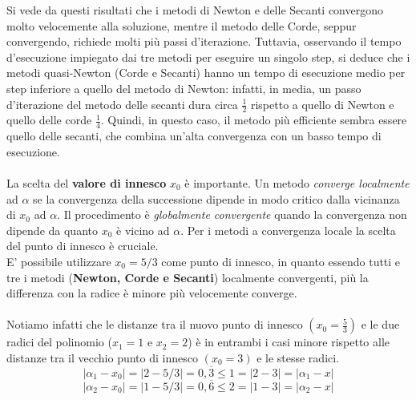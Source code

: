 Si vede da questi risultati che i metodi di Newton e delle Secanti convergono molto velocemente alla soluzione, mentre il metodo delle Corde, seppur convergendo, richiede molti più passi d'iterazione. Tuttavia, osservando il tempo d'esecuzione impiegato dai tre metodi per eseguire un singolo step, si deduce che i metodi quasi-Newton (Corde e Secanti) hanno un tempo di esecuzione medio per step inferiore a quello del metodo di Newton: infatti, in media, un passo d'iterazione del metodo delle secanti dura circa $\frac{1}{2}$ rispetto a quello di Newton e quello delle corde $\frac{1}{4}$. Quindi, in questo caso, il metodo più efficiente sembra essere quello delle secanti, che combina un'alta convergenza con un basso tempo di esecuzione.\\\\
La scelta del \textbf{valore di innesco} $x_{0}$ è importante. Un metodo \textit{converge localmente} ad $\alpha$ se la convergenza della successione dipende in modo critico dalla vicinanza di $x_{0}$ ad $\alpha$. Il procedimento è \textit{globalmente convergente} quando la convergenza non dipende da quanto $x_{0}$ è vicino ad $\alpha$. Per i metodi a convergenza locale la scelta del punto di innesco è cruciale.\\
E' possibile utilizzare $x_{0}=5/3$ come punto di innesco, in quanto essendo tutti e tre i metodi (\textbf{Newton, Corde e Secanti}) localmente convergenti, più la differenza con la radice è minore più velocemente converge.\\\\
Notiamo infatti che le distanze tra il nuovo punto di innesco $(x_0=\frac{5}{3})$ e le due radici del polinomio ($x_1=1$ e $x_2=2$) è in entrambi i casi minore rispetto alle distanze tra il vecchio punto di innesco $(x_0=3)$ e le stesse radici.
	\[
	|\alpha_1 - x_{0}| = |2 - 5/3| = 0,\overline{3} \leq 1 = |2 - 3| = |\alpha_1 - x|
	\]
	\[
	|\alpha_2 - x_{0}| = |1 - 5/3| = 0,\overline{6} \leq 2 = |1 - 3| = |\alpha_2 - x|
	\]
